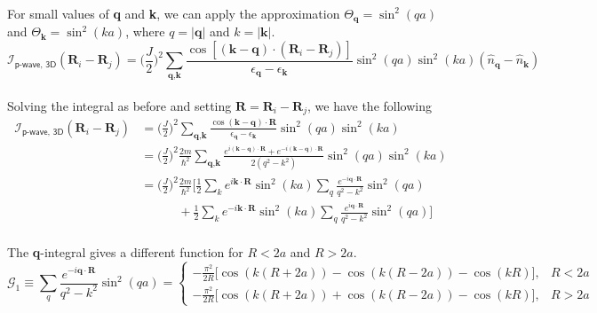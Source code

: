 \documentclass{article}
\begin{document}
\\
For small values of \textbf{q} and \textbf{k}, we can apply the approximation $\Theta_\textbf{q} = \sin^2(qa)$ and $\Theta_\textbf{k} = \sin^2(ka)$, where $q = |\textbf{q}|$ and $k = |\textbf{k}|$. 
\\
\begin{equation}
\mathcal{I}_\textsf{p-wave, 3D} (\textbf{R}_i - \textbf{R}_j) = \Bigg(\frac{J}{2}\Bigg)^2 \sum_{\textbf{q}, \textbf{k}}\frac{\cos[(\textbf{k} - \textbf{q}) \cdot ( \textbf{R}_i - \textbf{R}_j)]}{\epsilon_{\textbf{q}} - \epsilon_{\textbf{k}}}    \sin^2(qa)\sin^2(ka)(\hat{n}_\textbf{q} - \hat{n}_\textbf{k})
\end{equation}
\\
Solving the integral as before and setting $\textbf{R} = \textbf{R}_i - \textbf{R}_j$, we have the following
\\
\begin{equation}
\begin{split}
\mathcal{I}_\textsf{p-wave, 3D} (\textbf{R}_i - \textbf{R}_j) &= \Bigg(\frac{J}{2}\Bigg)^2 \sum_{\textbf{q}, \textbf{k}}\frac{\cos(\textbf{k} - \textbf{q}) \cdot \textbf{R}}{\epsilon_{\textbf{q}} - \epsilon_{\textbf{k}}}    \sin^2(qa)\sin^2(ka)\\
&=\Bigg(\frac{J}{2}\Bigg)^2 \frac{2m}{\hbar^2} \sum_{\textbf{q}, \textbf{k}} \frac{e^{i(\textbf{k}-\textbf{q}) \cdot \textbf{R}} + e^{-i(\textbf{k}-\textbf{q}) \cdot \textbf{R}}}{2(q^2 - k^2)}  \sin^2(qa)\sin^2(ka)\\
&= \Bigg(\frac{J}{2}\Bigg)^2 \frac{2m}{\hbar^2}\Bigg[\frac{1}{2}\sum_{k}e^{i\textbf{k} \cdot \textbf{R}} \sin^2(ka) \sum_{q}\frac{e^{-i\textbf{q} \cdot \textbf{R}}}{q^2-k^2}\sin^2(qa) \\   
 & \quad \quad \quad + \frac{1}{2}\sum_{k}e^{-i\textbf{k} \cdot \textbf{R}} \sin^2(ka) \sum_{q}\frac{e^{i\textbf{q} \cdot \textbf{R}}}{q^2-k^2}\sin^2(qa)\Bigg]
\end{split}
\end{equation}
\\
The \textbf{q}-integral gives a different function for $R<2a$ and $R>2a$.
\\
\begin{equation}
\mathcal{G}_1  \equiv \sum_{q}\frac{e^{-i\textbf{q} \cdot \textbf{R}}}{q^2-k^2}\sin^2(qa) = 
\begin{cases}
-\frac{\pi^2}{2R}\Big[\cos(k(R+2a)) - \cos(k(R-2a)) - \cos(kR) \Big], & R < 2a\\
-\frac{\pi^2}{2R}\Big[\cos(k(R+2a)) + \cos(k(R-2a)) - \cos(kR) \Big], & R > 2a
\end{cases}
\end{equation}
\end{document}
